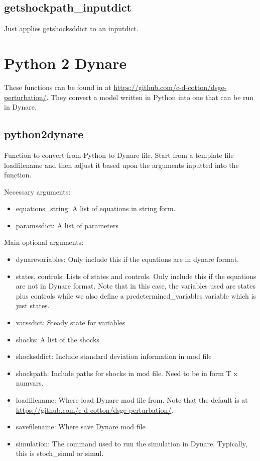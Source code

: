 \documentclass{article}
\theoremstyle{definition}
\begin{document}
\subsection{getshockpath\_inputdict}
Just applies getshocksddict to an inputdict.

\section{Python 2 Dynare}
These functions can be found in  at \url{https://github.com/c-d-cotton/dsge-perturbation/}. They convert a model written in Python into one that can be run in Dynare.

\subsection{python2dynare}
Function to convert from Python to Dynare file. Start from a template file loadfilename and then adjust it based upon the arguments inputted into the function.

Necessary arguments:
\begin{itemize}
    \item equations\_string: A list of equations in string form.
    \item paramssdict: A list of parameters
\end{itemize}

Main optional arguments:
\begin{itemize}
    \item dynarevariables: Only include this if the equations are in dynare format.
    \item states, controls: Lists of states and controls. Only include this if the equations are not in Dynare format. Note that in this case, the variables used are states plus controls while we also define a predetermined\_variables variable which is just states.
    \item varssdict: Steady state for variables
    \item shocks: A list of the shocks
    \item shocksddict: Include standard deviation information in mod file
    \item shockpath: Include paths for shocks in mod file. Need to be in form T x numvars.
    \item loadfilename: Where load Dynare mod file from. Note that the default is  at \url{https://github.com/c-d-cotton/dsge-perturbation/}.
    \item savefilename: Where save Dynare mod file
    \item simulation: The command used to run the simulation in Dynare. Typically, this is stoch\_simul or simul.
\end{itemize}
\end{document}
